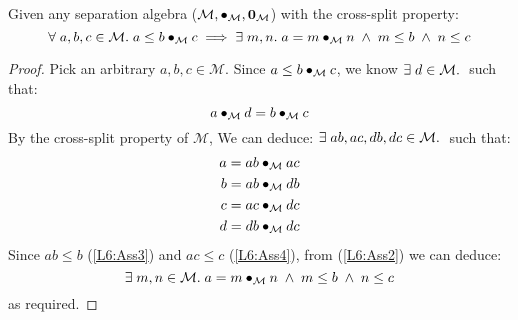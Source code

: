 \begin{lemma}[]\label{lem:divideUpper}
%
Given any separation algebra ($\mathcal{M}, \bullet_{\mathcal{M}}, \mathbf{0}_{\mathcal{M}}$) with the cross-split property:
\[
	\forall\; a, b, c \in \mathcal{M}.\; a \leq b \bullet_{\mathcal{M}} c \implies \exists\; m, n.\; a = m \bullet_{\mathcal{M}} n \;\land\; m \leq b \;\land\; n \leq c
\]
%
\begin{proof}
Pick an arbitrary $a, b, c \in \mathcal{M}$. Since $a \leq b \bullet_{\mathcal{M}} c$, we know $\exists\; d \in \mathcal{M}.\;$ such that:
%
\begin{equation}
	a \bullet_{\mathcal{M}} d = b \bullet_{\mathcal{M}} c \label{L6:Ass1}
\end{equation}
%
By the cross-split property of $\mathcal{M}$, We can deduce: $\exists\; ab, ac, db, dc \in \mathcal{M}.\;$ such that:
%
\begin{align}
	a = ab \bullet_{\mathcal{M}} ac \label{L6:Ass2}\\
	b = ab \bullet_{\mathcal{M}} db \label{L6:Ass3}\\
	c = ac \bullet_{\mathcal{M}} dc \label{L6:Ass4}\\
	d = db \bullet_{\mathcal{M}} dc \nonumber 
\end{align}
%
Since $ab \leq b$ (\ref{L6:Ass3}) and $ac \leq c$ (\ref{L6:Ass4}), from (\ref{L6:Ass2}) we can deduce:
%
\begin{equation}
	\exists\; m, n \in \mathcal{M}.\; a = m \bullet_{\mathcal{M}} n \;\land\; m \leq b \;\land\; n \leq c \nonumber
\end{equation}
%
as required.
\end{proof}
\end{lemma}
%
%
